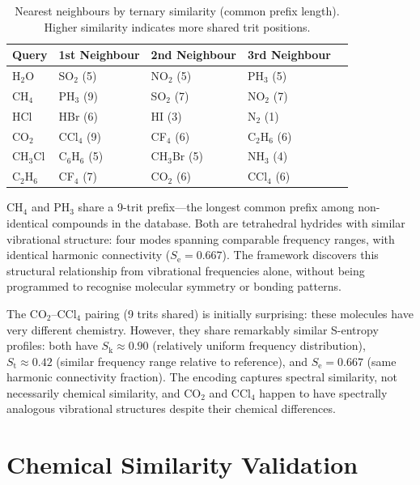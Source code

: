 \documentclass[11pt,a4paper]{article}
\theoremstyle{definition}
\theoremstyle{remark}
\newcommand{\Sk}{S_{\mathrm{k}}}
\newcommand{\St}{S_{\mathrm{t}}}
\newcommand{\Se}{S_{\mathrm{e}}}
\begin{document}
\begin{table}[H]
\centering
\caption{Nearest neighbours by ternary similarity (common prefix length). Higher similarity indicates more shared trit positions.}
\label{tab:nearest}
\begin{tabular}{lllll}
\toprule
Query & 1st Neighbour & 2nd Neighbour & 3rd Neighbour \\
\midrule
H$_2$O & SO$_2$ (5) & NO$_2$ (5) & PH$_3$ (5) \\
CH$_4$ & PH$_3$ (9) & SO$_2$ (7) & NO$_2$ (7) \\
HCl   & HBr (6) & HI (3) & N$_2$ (1) \\
CO$_2$ & CCl$_4$ (9) & CF$_4$ (6) & C$_2$H$_6$ (6) \\
CH$_3$Cl & C$_6$H$_6$ (5) & CH$_3$Br (5) & NH$_3$ (4) \\
C$_2$H$_6$ & CF$_4$ (7) & CO$_2$ (6) & CCl$_4$ (6) \\
\bottomrule
\end{tabular}
\end{table}

CH$_4$ and PH$_3$ share a 9-trit prefix---the longest common prefix among non-identical compounds in the database. Both are tetrahedral hydrides with similar vibrational structure: four modes spanning comparable frequency ranges, with identical harmonic connectivity ($\Se = 0.667$). The framework discovers this structural relationship from vibrational frequencies alone, without being programmed to recognise molecular symmetry or bonding patterns.

The CO$_2$--CCl$_4$ pairing (9 trits shared) is initially surprising: these molecules have very different chemistry. However, they share remarkably similar S-entropy profiles: both have $\Sk \approx 0.90$ (relatively uniform frequency distribution), $\St \approx 0.42$ (similar frequency range relative to reference), and $\Se = 0.667$ (same harmonic connectivity fraction). The encoding captures spectral similarity, not necessarily chemical similarity, and CO$_2$ and CCl$_4$ happen to have spectrally analogous vibrational structures despite their chemical differences.

\section{Chemical Similarity Validation}
\label{sec:similarity}
\end{document}
